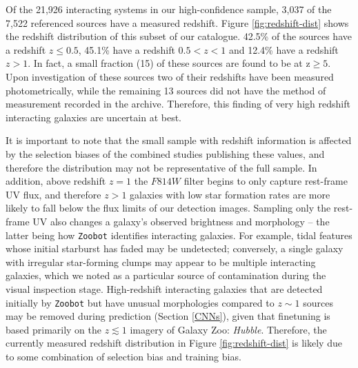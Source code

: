 {Of the 21,926 interacting systems in our high-confidence sample, 3,037 of the 7,522 referenced sources have a measured redshift. Figure \ref{fig:redshift-dist} shows the redshift distribution of this subset of our catalogue. 42.5\% of the sources have a redshift $z \leq 0.5$, 45.1\% have a redshift $0.5 < z < 1$ and 12.4\% have a redshift $z > 1$. In fact, a small fraction (15) of these sources are found to be at z$\geq 5$. Upon investigation of these sources two of their redshifts have been measured photometrically, while the remaining 13 sources did not have the method of measurement recorded in the archive. Therefore, this finding of very high redshift interacting galaxies are uncertain at best. 

It is important to note that the small sample with redshift information is affected by the selection biases of the combined studies publishing these values, and therefore the distribution may not be representative of the full sample. In addition, above redshift $z = 1$ the $F814W$ filter begins to only capture rest-frame UV flux, and therefore $z > 1$ galaxies with low star formation rates are more likely to fall below the flux limits of our detection images. Sampling only the rest-frame UV also changes a galaxy's observed brightness and morphology \citep[e.g.,][]{2022ApJ...938L...2F} -- the latter being how \texttt{Zoobot} identifies interacting galaxies. For example, tidal features whose initial starburst has faded may be undetected; conversely, a single galaxy with irregular star-forming clumps may appear to be multiple interacting galaxies, which we noted as a particular source of contamination during the visual inspection stage. High-redshift interacting galaxies that are detected initially by \texttt{Zoobot} but have unusual morphologies compared to $z \sim 1$ sources may be removed during prediction (Section \ref{CNNs}), given that finetuning is based primarily on the $z \lesssim 1$ imagery of Galaxy Zoo: \emph{Hubble}. Therefore, the currently measured redshift distribution in Figure \ref{fig:redshift-dist} is likely due to some combination of selection bias and training bias. 

}
